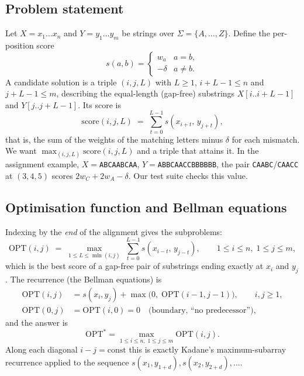 \documentclass[11pt]{article}
\begin{document}
\subsection{Problem statement}
Let $X = x_1 \dots x_n$ and $Y = y_1 \dots y_m$ be strings over
$\Sigma = \{A,\dots,Z\}$. Define the per-position score
\[
  s(a,b) = \begin{cases} w_a & a = b,\\ -\delta & a \ne b. \end{cases}
\]
A candidate solution is a triple $(i,j,L)$ with $L\ge 1$, $i+L-1\le n$ and
$j+L-1\le m$, describing the equal-length (gap-free) substrings
$X[i..i+L-1]$ and $Y[j..j+L-1]$. Its score is
\[
  \mathrm{score}(i,j,L) \;=\; \sum_{t=0}^{L-1} s(x_{i+t},\, y_{j+t}),
\]
that is, the sum of the weights of the matching letters minus $\delta$ for each
mismatch. We want $\max_{(i,j,L)} \mathrm{score}(i,j,L)$ and a triple that
attains it. In the assignment example, $X=$\texttt{ABCAABCAA},
$Y=$\texttt{ABBCAACCBBBBBB}, the pair \texttt{CAABC}/\texttt{CAACC} at
$(3,4,5)$ scores $2w_C+2w_A-\delta$. Our test suite checks this value.

\subsection{Optimisation function and Bellman equations}
Indexing by the \emph{end} of the alignment gives the subproblems:
\[
  \mathrm{OPT}(i,j) \;=\; \max_{1\le L\le \min(i,j)} \; \sum_{t=0}^{L-1} s(x_{i-t},\, y_{j-t}),
  \qquad 1\le i\le n,\; 1\le j\le m,
\]
which is the best score of a gap-free pair of substrings ending exactly at
$x_i$ and $y_j$. The recurrence (the Bellman equations) is
\begin{align*}
  \mathrm{OPT}(i,j) &= s(x_i,y_j) + \max\bigl(0,\; \mathrm{OPT}(i-1,j-1)\bigr), \qquad i,j\ge 1,\\
  \mathrm{OPT}(0,j) &= \mathrm{OPT}(i,0) = 0 \quad\text{(boundary, ``no predecessor'')},
\end{align*}
and the answer is
\[
  \mathrm{OPT}^\ast = \max_{1\le i\le n,\;1\le j\le m} \mathrm{OPT}(i,j).
\]
Along each diagonal $i-j=\text{const}$ this is exactly Kadane's maximum-subarray
recurrence applied to the sequence $s(x_1,y_{1+d}), s(x_2,y_{2+d}),\dots$.
\end{document}

